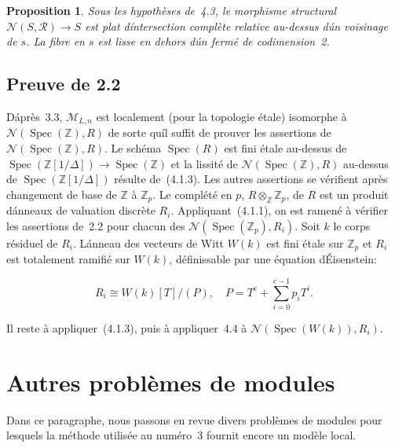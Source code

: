 \documentclass[11pt,a4paper]{article}
\theoremstyle{plain}
\newtheorem{proposition}[theorem]{Proposition}
\theoremstyle{definition}
\DeclareMathOperator{\Spec}{Spec}
\begin{document}
\begin{proposition}
Sous les hypoth\`eses de~4.3, le morphisme structural
$\mathscr{N}(S, \mathscr{R}) \to S$ est plat d\'intersection compl\`ete relative au-dessus d\'un voisinage de
$s$. La fibre en $s$ est lisse en dehors d\'un ferm\'e de codimension~2.
\end{proposition}

\subsection{Preuve de 2.2}

D\'apr\`es~3.3, $\mathscr{M}_{L,n}$ est localement (pour la topologie \'etale)
isomorphe \`a $\mathscr{N}(\Spec(\mathbb{Z}), R)$ de sorte qu\'il suffit de prouver les assertions de
$\mathscr{N}(\Spec(\mathbb{Z}), R)$. Le sch\'ema $\Spec(R)$ est fini \'etale au-dessus de
$\Spec(\mathbb{Z}[1/\Delta]) \to \Spec(\mathbb{Z})$ et la lissit\'e de $\mathscr{N}(\Spec(\mathbb{Z}), R)$ au-dessus de
$\Spec(\mathbb{Z}[1/\Delta])$ r\'esulte de~(4.1.3). Les autres assertions se v\'erifient apr\`es changement
de base de $\mathbb{Z}$ \`a $\mathbb{Z}_p$. Le compl\'et\'e en $p$, $R \otimes_\mathbb{Z} \mathbb{Z}_p$, de $R$ est un produit
d\'anneaux de valuation discr\`ete $R_i$. Appliquant~(4.1.1), on est ramen\'e \`a v\'erifier
les assertions de~2.2 pour chacun des $\mathscr{N}(\Spec(\mathbb{Z}_p), R_i)$. Soit $k$ le corps r\'esiduel
de $R_i$. L\'anneau des vecteurs de Witt $W(k)$ est fini \'etale sur $\mathbb{Z}_p$ et $R_i$ est
totalement ramifi\'e sur $W(k)$, d\'efinissable par une \'equation d\'Eisenstein:

\begin{equation}
R_i \cong W(k)[T]/(P), \quad P = T^{e} + \sum_{i=0}^{e-1} p_i T^i.
\end{equation}

Il reste \`a appliquer~(4.1.3), puis \`a appliquer~4.4 \`a $\mathscr{N}(\Spec(W(k)), R_i)$.

\section{Autres probl\`emes de modules}

Dans ce paragraphe, nous passons en revue divers probl\`emes de modules pour
lesquels la m\'ethode utilis\'ee au num\'ero~3 fournit encore un mod\`ele local.

\subsection{}
\end{document}
